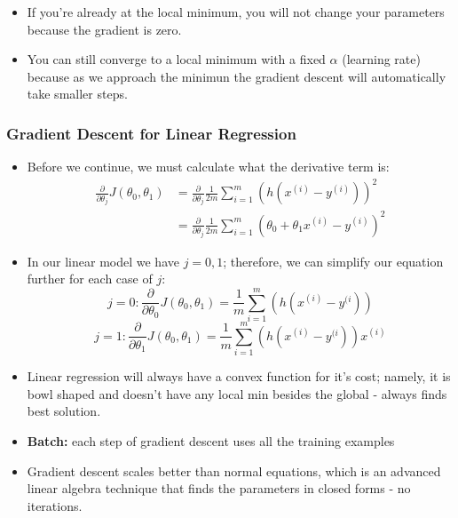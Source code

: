 \begin{itemize}[--]
	\item If you're already at the local minimum, you will not change your parameters because the gradient is zero.
	\item You can still converge to a local minimum with a fixed $\alpha$ (learning rate) because as we approach the minimun the gradient descent will automatically take smaller steps.
\end{itemize}

\subsubsection{Gradient Descent for Linear Regression}
\begin{itemize}[--]
	\item Before we continue, we must calculate what the derivative term is:
	\begin{equation*}
	\begin{split}
		\frac{\partial}{\partial\theta_j}J(\theta_0, \theta_1) &= \frac{\partial}{\partial\theta_j}\frac{1}{2m}\sum_{i=1}^{m}(h(x^{(i)}-y^{(i)}))^2\\ 
		&= \frac{\partial}{\partial\theta_j}\frac{1}{2m}\sum_{i=1}^{m}(\theta_0+\theta_1 x^{(i)} - y^{(i)})^2
	\end{split}
	\end{equation*}
	\item In our linear model we have $j=0,1$; therefore, we can simplify our equation further for each case of $j$:
	$$j=0:\frac{\partial}{\partial\theta_0}J(\theta_0, \theta_1)=\frac{1}{m}\sum_{i=1}^{m}(h(x^{(i)} - y^{(i}))$$
	$$j=1:\frac{\partial}{\partial\theta_1}J(\theta_0, \theta_1)=\frac{1}{m}\sum_{i=1}^{m}(h(x^{(i)} - y^{(i}))x^{(i)}$$
	\item Linear regression will always have a convex function for it's cost; namely, it is bowl shaped and doesn't have any local min besides the global - always finds best solution.
	\item \textbf{Batch:} each step of gradient descent uses all the training examples
	\item Gradient descent scales better than normal equations, which is an advanced linear algebra technique that finds the parameters in closed forms - no iterations.
\end{itemize}